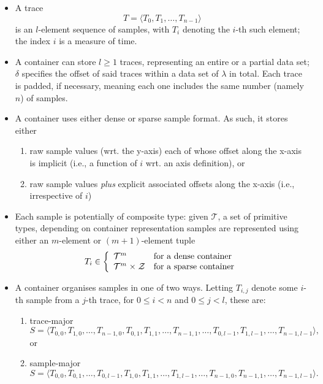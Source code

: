 \documentclass[10pt,a4paper]{llncs}
\begin{document}
\begin{itemize}
\item A trace 
      \[
      T = \langle T_0, T_1, \ldots, T_{n-1} \rangle
      \]
      is an $l$-element sequence of samples, with $T_i$ denoting the $i$-th 
      such element; the index $i$ is a measure of time.
\item A container can store $l \geq 1$ traces, representing an entire or a
      partial data set; $\delta$ specifies the offset of said traces within 
      a data set of $\lambda$ in total.  Each trace is padded, if necessary, 
      meaning each one includes the same number (namely $n$) of samples.
\item A container uses either dense or sparse sample format.  As such, it 
      stores either

      \begin{enumerate}      
      \item raw sample values (wrt. the y-axis) each of whose offset along 
            the x-axis is implicit (i.e., a function of $i$ wrt. an axis 
            definition),
            or
      \item raw sample values {\em plus} explicit associated offsets along 
            the x-axis (i.e., irrespective of $i$)
      \end{enumerate}      

\item Each sample is potentially of composite type: given ${\mathcal T}$, a
      set of primitive types, depending on container representation samples
      are represented using either an $m$-element or $(m+1)$-element tuple
      \[
      T_i \in \left\{
              \begin{array}{c@{\;}c@{\;}cl}
              {\mathcal T}^m &      &              & \mbox{for a dense  container} \\
              {\mathcal T}^m &\times& {\mathcal Z} & \mbox{for a sparse container} \\
              \end{array}
              \right.
      \]
\item A container organises samples in one of two ways.  Letting $T_{i,j}$ 
      denote some $i$-th sample from a $j$-th trace, for $0 \leq i < n$ and 
      $0 \leq j < l$, these are:

      \begin{enumerate}
      \item trace-major 
            \[
            S = \langle T_{  0,  0}, T_{  1,  0}, \ldots, T_{n-1,  0},
                        T_{  0,  1}, T_{  1,  1}, \ldots, T_{n-1,  1},
                                                  \ldots,
                        T_{  0,l-1}, T_{  1,l-1}, \ldots, T_{n-1,l-1} \rangle ,
            \]
            or
      \item sample-major
            \[
            S = \langle T_{  0,  0}, T_{  0,  1}, \ldots, T_{  0,l-1},
                        T_{  1,  0}, T_{  1,  1}, \ldots, T_{  1,l-1},
                                                  \ldots,
                        T_{n-1,  0}, T_{n-1,  1}, \ldots, T_{n-1,l-1} \rangle .
            \]
      \end{enumerate}


\end{itemize}
\end{document}
